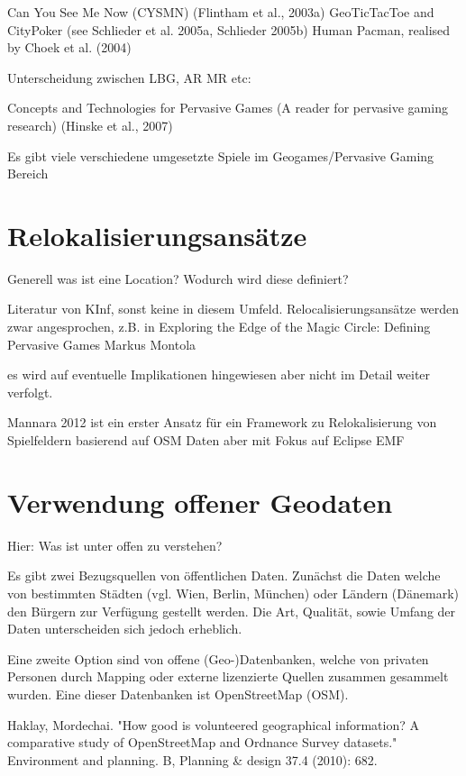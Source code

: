 Can You See Me Now (CYSMN) (Flintham et al., 2003a)
GeoTicTacToe and CityPoker (see Schlieder et al. 2005a, Schlieder 2005b)
Human Pacman, realised by Choek et al. (2004)

Unterscheidung zwischen LBG, AR MR etc:

Concepts and Technologies for Pervasive Games (A reader for pervasive gaming research) (Hinske et al., 2007)

Es gibt viele verschiedene umgesetzte Spiele im Geogames/Pervasive Gaming Bereich

\section{Relokalisierungsansätze}

Generell was ist eine Location?
Wodurch wird diese definiert?


Literatur von KInf, sonst keine in diesem Umfeld.
Relocalisierungsansätze werden zwar angesprochen, z.B. in 
Exploring the Edge of the Magic Circle: 
Defining Pervasive Games 
Markus Montola 

es wird auf eventuelle Implikationen hingewiesen aber nicht im Detail weiter verfolgt.

Mannara 2012 ist ein erster Ansatz für ein Framework zu Relokalisierung von Spielfeldern basierend auf OSM Daten aber mit Fokus auf Eclipse EMF

\section{Verwendung offener Geodaten}
\label{subsec:S3_offeneGeodaten}

Hier: Was ist unter offen zu verstehen?

Es gibt zwei Bezugsquellen von öffentlichen Daten.
Zunächst die Daten welche von bestimmten Städten (vgl. Wien, Berlin, München) oder Ländern (Dänemark) den Bürgern zur Verfügung gestellt werden. Die Art, Qualität, sowie Umfang der Daten unterscheiden sich jedoch erheblich.

Eine zweite Option sind von offene (Geo-)Datenbanken, welche von privaten Personen durch Mapping oder externe lizenzierte Quellen zusammen gesammelt wurden. Eine dieser Datenbanken ist OpenStreetMap (OSM).


Haklay, Mordechai. "How good is volunteered geographical information? A comparative study of OpenStreetMap and Ordnance Survey datasets." Environment and planning. B, Planning \& design 37.4 (2010): 682.

